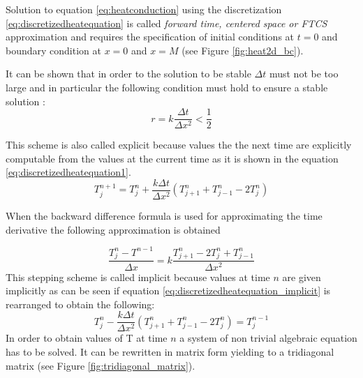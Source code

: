 Solution to equation \ref{eq:heatconduction} using the discretization \ref{eq:discretizedheatequation} is called \textit{forward time, centered space or FTCS} approximation and requires the specification of initial conditions at $t=0$ and boundary condition at $x=0$ and $x=M$ (see Figure \ref{fig:heat2d_bc}).

It can be shown that in order to the solution to be stable $\Delta t$ must not be too large and in particular the following condition must hold to ensure a stable solution \cite{isaacson:1994,anderson:1994,crank:1996}:
\[ 
 r= k \frac{\Delta t}{\Delta x^2}< \frac{1}{2}
\]

This scheme is also called explicit because values the the next time are explicitly computable from the values at the current time as it is shown in the equation \ref{eq:discretizedheatequation1}.
 \begin{equation}
  T^{n+1}_{j} = T^n_{j} + \frac{k \Delta t}{\Delta x^2} (T^n_{j+1}+T^n_{j-1}-2T^n_{j})
 \label{eq:discretizedheatequation1}
 \end{equation}

When the backward difference formula is used for approximating the time derivative the following approximation is obtained

 \begin{equation}
  \frac{T^{n}_{j} - T^{n-1}_{}}{\Delta x} = k \frac{T^n_{j+1}- 2T^n_{j} + T^n_{j-1}}{\Delta x^2}
 \label{eq:discretizedheatequation_implicit}
 \end{equation}
 This stepping scheme is called implicit because values at time $n$ are given implicitly as can be seen if equation \ref{eq:discretizedheatequation_implicit} is rearranged to obtain the following: 
 \begin{equation}
T^n_{j} - \frac{k \Delta t}{\Delta x^2} (T^n_{j+1}+T^n_{j-1}-2T^n_{j}) =   T^{n-1}_{j}
 \label{eq:discretizedheatequation1}
 \end{equation}
 In order to obtain values of T at time $n$ a system of non trivial algebraic equation has to be solved. 
 It can be rewritten in matrix form yielding to a tridiagonal matrix (see Figure \ref{fig:tridiagonal_matrix}).

